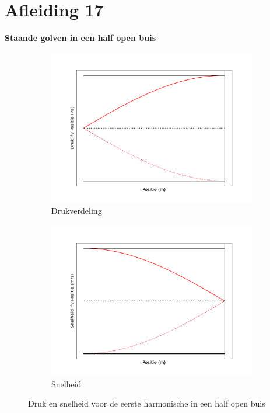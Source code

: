 \documentclass[a4paper,kul]{kulakarticle} %
\begin{document}
\section{Afleiding 17}
\textbf{Staande golven in een half open buis}\\
\begin{figure}[!h]
	\centering
	\begin{subfigure}{.5\textwidth}
		\centering
		\includegraphics[width=1\linewidth]{HalfOpenBuisEersteDruk}
		\caption{Drukverdeling}
		\label{fig:EersteHalfBuisDruk}
	\end{subfigure}%
	\begin{subfigure}{.5\textwidth}
		\centering
		\includegraphics[width=1\linewidth]{HalfOpenBuisEersteSnelheid}
		\caption{Snelheid}
		\label{fig:EersteHalfBuisSnelheid}
	\end{subfigure}
	\caption{Druk en snelheid voor de eerste harmonische in een half open buis}
	\label{fig:HalfOpenBuisEerste}
\end{figure}\\
\end{document}
